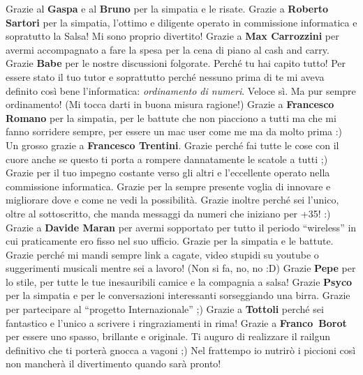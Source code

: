 \documentclass[10pt]{amsart}
\newcommand{\n}[1]{{\Large \bf #1}}
\begin{document}
Grazie al \n{Gaspa} e al \n{Bruno} per la simpatia e le risate. Grazie a \n{Roberto Sartori} per la simpatia, l'ottimo e diligente operato in commissione informatica e sopratutto la Salsa! Mi sono proprio divertito!
Grazie a \n{Max Carrozzini} per avermi accompagnato a fare la spesa per la cena di piano al cash and carry. Grazie \n{Babe} per le nostre discussioni folgorate. Perché tu hai capito tutto! Per essere stato il tuo tutor e soprattutto perché nessuno prima di te mi aveva definito così bene l'informatica: \emph{ordinamento di numeri}. Veloce sì. Ma pur sempre ordinamento! (Mi tocca darti in buona misura ragione!)
Grazie a \n{Francesco Romano} per la simpatia, per le battute che non piacciono a tutti ma che mi fanno sorridere sempre, per essere un mac user come me ma da molto prima :)
Un grosso grazie a \n{Francesco Trentini}. Grazie perché fai tutte le cose con il cuore anche se questo ti porta a rompere dannatamente le scatole a tutti ;) Grazie per il tuo impegno costante verso gli altri e l'eccellente operato nella commissione informatica. Grazie per la sempre presente voglia di innovare e migliorare dove e come ne vedi la possibilità. Grazie inoltre perché sei l'unico, oltre al sottoscritto, che manda messaggi da numeri che iniziano per +35! :)
Grazie a \n{Davide Maran} per avermi sopportato per tutto il periodo ``wireless'' in cui praticamente ero fisso nel suo ufficio. Grazie per la simpatia e le battute. Grazie perché mi mandi sempre link a cagate, video stupidi su youtube o suggerimenti musicali mentre sei a lavoro! (Non si fa, no, no :D)
Grazie \n{Pepe} per lo stile, per tutte le tue inesauribili camice e la compagnia a salsa! Grazie \n{Psyco} per la simpatia e per le conversazioni interessanti sorseggiando una birra. Grazie per partecipare al ``progetto Internazionale'' ;)
Grazie a \n{Tottoli} perché sei fantastico e l'unico a scrivere i ringraziamenti in rima! Grazie a \mbox{\n{Franco Borot}} per essere uno spasso, brillante e originale. Ti auguro di realizzare il railgun definitivo che ti porterà gnocca a vagoni ;) Nel frattempo io nutrirò i piccioni così non mancherà il divertimento quando sarà pronto!
\end{document}
